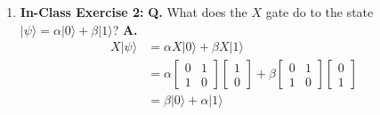 \documentclass[main.tex]{subfiles}
\begin{document}
\begin{enumerate}
\item[] \textbf{In-Class Exercise 2:} \textbf{Q.} What does the $X$ gate do to the state $|\psi\rangle=\alpha|0\rangle+\beta|1\rangle$? \textbf{A.} 
\begin{align*}
    X |\psi\rangle  & = \alpha X |0\rangle + \beta X|1\rangle\\
                    & =  \alpha \left[\begin{array}{ll} 0 & 1 \\ 1 & 0 \end{array}\right] \left[\begin{array}{l} 1 \\ 0 \end{array} \right]
                    + \beta \left[\begin{array}{ll} 0 & 1 \\ 1 & 0 \end{array}\right] \left[\begin{array}{l} 0 \\ 1 \end{array} \right]\\
                    & = \beta |0\rangle + \alpha |1\rangle\\
\end{align*}


\end{enumerate}
\end{document}
